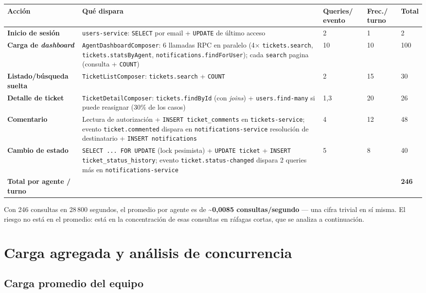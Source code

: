 \documentclass[11pt,a4paper]{article}
\begin{document}
\begin{longtable}{@{}>{\bfseries}p{3.3cm} L{4.6cm} p{1.6cm} p{1.4cm} p{1.3cm}@{}}
\toprule
\textbf{Acción} & \textbf{Qué dispara} & \textbf{Queries/ evento} & \textbf{Frec./ turno} & \textbf{Total} \\
\midrule
\endhead
Inicio de sesión & \texttt{users-service}: \texttt{SELECT} por email + \texttt{UPDATE} de último acceso & 2 & 1 & 2 \\
Carga de \emph{dashboard} & \texttt{AgentDashboardComposer}: 6 llamadas RPC en paralelo (4× \texttt{tickets.search}, \texttt{tickets.statsByAgent}, \texttt{notifications.findForUser}); cada \texttt{search} pagina (consulta + \texttt{COUNT}) & 10 & 10 & 100 \\
Listado/búsqueda suelta & \texttt{TicketListComposer}: \texttt{tickets.search} + \texttt{COUNT} & 2 & 15 & 30 \\
Detalle de ticket & \texttt{TicketDetailComposer}: \texttt{tickets.findById} (con \emph{joins}) + \texttt{users.find-many} si puede reasignar (30\% de los casos) & 1{,}3 & 20 & 26 \\
Comentario & Lectura de autorización + \texttt{INSERT ticket\_comments} en \texttt{tickets-service}; evento \texttt{ticket.commented} dispara en \texttt{notifications-service} resolución de destinatario + \texttt{INSERT notifications} & 4 & 12 & 48 \\
Cambio de estado & \texttt{SELECT ... FOR UPDATE} (lock pesimista) + \texttt{UPDATE ticket} + \texttt{INSERT ticket\_status\_history}; evento \texttt{ticket.status-changed} dispara 2 queries más en \texttt{notifications-service} & 5 & 8 & 40 \\
\midrule
\textbf{Total por agente / turno} & & & & \textbf{246} \\
\bottomrule
\end{longtable}

Con 246 consultas en 28\,800 segundos, el promedio por agente es de
\textbf{\textasciitilde 0{,}0085 consultas/segundo} — una cifra trivial en
sí misma. El riesgo no está en el promedio: está en la concentración de
esas consultas en ráfagas cortas, que se analiza a continuación.

\section{Carga agregada y análisis de concurrencia}

\subsection{Carga promedio del equipo}
\end{document}
